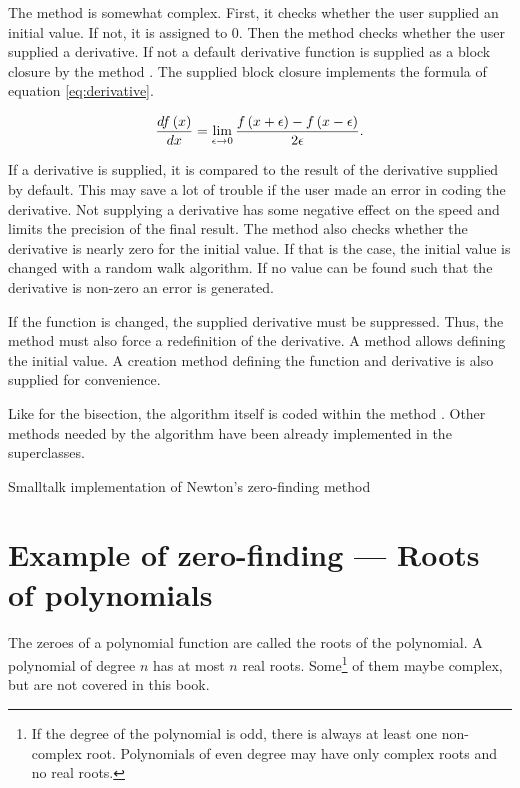 The method  is somewhat complex. First,
it checks whether the user supplied an initial value. If not, it
is assigned to 0. Then the method checks whether the user supplied
a derivative. If not a default derivative function is supplied as
a block closure by the method . The
supplied block closure implements the formula of equation
\ref{eq:derivative}.

\begin{equation}
\label{eq:derivative} {df\left(x\right)\over dx}=\lim_{\epsilon\to
0}{f\left(x+\epsilon\right)-f\left(x-\epsilon\right)\over
2\epsilon}.
\end{equation}

If a derivative is supplied, it is compared to the result of the
derivative supplied by default. This may save a lot of trouble if
the user made an error in coding the derivative. Not supplying a
derivative has some negative effect on the speed and limits the
precision of the final result. The method  also checks whether the derivative is nearly
zero for the initial value. If that is the case, the initial value
is changed with a random walk algorithm. If no value can be found
such that the derivative is non-zero an error is generated.

If the function is changed, the supplied derivative must be
suppressed.
Thus, the method  must also force a
redefinition of the derivative.
A method allows defining the initial value. A creation method defining the function and
derivative is also supplied for convenience.

Like for the bisection, the algorithm itself is coded within the
method . Other methods needed by the
algorithm have been already implemented in the superclasses.
\begin{listing} Smalltalk implementation of Newton's zero-finding method \label{ls:newtonZero}

\end{listing}

\section{Example of zero-finding --- Roots of polynomials}
\label{sec:polroots} The zeroes of a polynomial function are
called the roots of the polynomial. A polynomial of degree $n$ has
at most $n$ real roots. Some\footnote{If the degree of the
polynomial is odd, there is always at least one non-complex root.
Polynomials of even degree may have only complex roots and no real
roots.} of them maybe complex, but are not covered in this book.

